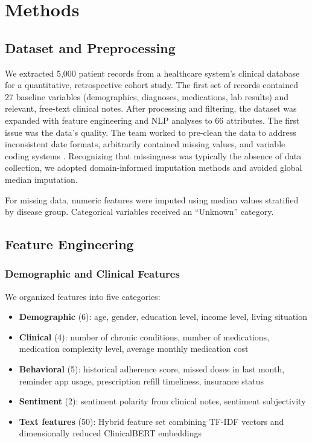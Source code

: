 \documentclass{article}
\begin{document}
\section{Methods}\label{sec:methods}

\subsection{Dataset and Preprocessing}\label{subsec:dataset}

We extracted 5,000 patient records from a healthcare system's clinical database for a quantitative, retrospective cohort study. The first set of records contained 27 baseline variables (demographics, diagnoses, medications, lab results) and relevant, free-text clinical notes. After processing and filtering, the dataset was expanded with feature engineering and NLP analyses to 66 attributes. The first issue was the data's quality. The team worked to pre-clean the data to address inconsistent date formats, arbitrarily contained missing values, and variable coding systems . Recognizing that missingness was typically the absence of data collection, we adopted domain-informed imputation methods and avoided global median imputation.

For missing data, numeric features were imputed using median values stratified by disease group. Categorical variables received an ``Unknown'' category. 

\subsection{Feature Engineering}\label{subsec:features}

\subsubsection{Demographic and Clinical Features}\label{subsubsec:demo}

We organized features into five categories:
\begin{itemize}
\item \textbf{Demographic} (6): age, gender, education level, income level, living situation
\item \textbf{Clinical} (4): number of chronic conditions, number of medications, medication complexity level, average monthly medication cost
\item \textbf{Behavioral} (5): historical adherence score, missed doses in last month, reminder app usage, prescription refill timeliness, insurance status
\item \textbf{Sentiment} (2): sentiment polarity from clinical notes, sentiment subjectivity
\item \textbf{Text features} (50): Hybrid feature set combining TF-IDF vectors and dimensionally reduced ClinicalBERT embeddings
\end{itemize}
\end{document}
